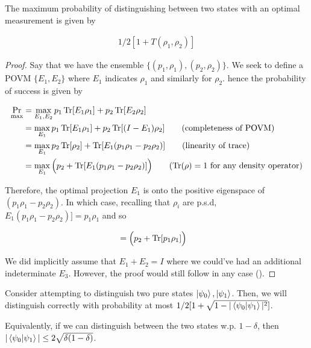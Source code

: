 \documentclass[main.tex]{subfiles}
\begin{document}
{\begin{subappendices}
\begin{lemma}
The maximum probability of distinguishing between two states with an optimal measurement is given by

\begin{align*}
	1/2[1 + T(\rho_1, \rho_2)]
\end{align*}
	
\end{lemma}
\begin{proof}
Say that we have the ensemble $\{ (p_1, \rho_1), (p_2, \rho_2)\}$. We seek to define a POVM $\{E_1, E_2 \}$ where $E_1$ indicates $\rho_1$ and similarly for $\rho_2$. hence the probability of success is given by

\begin{align*}
\Pr_{\max} &= \max_{E_1, E_2}p_1\Tr[E_1\rho_1] + p_2\Tr[E_2\rho_2] \\
&= \max_{E_1} p_1\Tr[E_1\rho_1] + p_2\Tr[(I - E_1)\rho_2] \tag{completeness of POVM} \\
&= \max_{E_1}p_2\Tr[\rho_2] + \Tr[E_1(p_1\rho_1 - p_2\rho_2)] \tag{linearity of trace} \\
&= \max_{E_1} \Big( p_2 + \Tr[E_1(p_1\rho_1 - p_2\rho_2)]\Big) \tag{$\Tr(\rho) = 1$ for any density operator}
\end{align*}

Therefore, the optimal projection $E_1$ is onto the positive eigenspace of $(p_1\rho_1 - p_2\rho_2)$. In which case, recalling that $\rho_i$ are p.s.d, $E_1(p_1\rho_1 - p_2\rho_2)] = p_1 \rho_1$ and so

\begin{align*}
&= 	\Big( p_2 + \Tr[p_1\rho_1]\Big)
\end{align*}
 
	
We did implicitly assume that $E_1 + E_2 = I$ where we could've had an additional indeterminate $E_3$. However, the proof would still follow in any case (\cite{nielsen2010quantum}).
\end{proof}


\begin{corollary}
\label{cor:distinguish-two-pure-states}
Consider attempting to distinguish two pure states $\ket{\psi_0}, \ket{\psi_1}$. Then, we will distinguish correctly with probability at most $1/2[1 + \sqrt{1 - |\bra{\psi_0}\ket{\psi_1}|^2}]$.

Equivalently, if we can distinguish between the two states w.p. $1 - \delta$, then $|\bra{\psi_0}\ket{\psi_1}| \leq 2\sqrt{\delta(1-\delta)}$. 	
\end{corollary}


\end{subappendices}}
\end{document}
